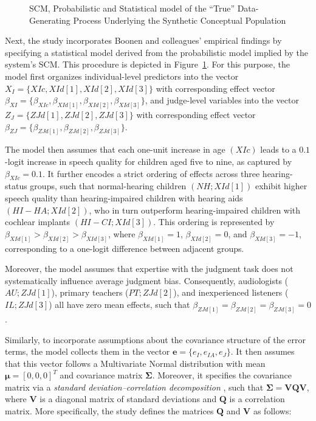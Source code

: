 \documentclass[
  authoryear,
  review,
  1p]{elsarticle}
\begin{document}
\begin{figure}[H]
\begin{minipage}[t]{0.33\linewidth}
{}


\end{minipage}%

\caption{\label{fig-CP}SCM, Probabilistic and Statistical model of the
``True'' Data-Generating Process Underlying the Synthetic Conceptual
Population}

\end{figure}%

Next, the study incorporates Boonen and colleagues'
\citeyearpar{Boonen_et_al_2020} empirical findings by specifying a
statistical model derived from the probabilistic model implied by the
system's SCM. This procedure is depicted in Figure~\ref{fig-CP}. For
this purpose, the model first organizes individual-level predictors into
the vector \(X_{I} = \{ XIc, XId[1], XId[2], XId[3] \}\) with
corresponding effect vector
\(\beta_{XI} = \{ \beta_{XIc}, \beta_{XId[1]}, \beta_{XId[2]}, \beta_{XId[3]} \}\),
and judge-level variables into the vector
\(Z_{J} = \{ ZJd[1], ZJd[2], ZJd[3] \}\) with corresponding effect
vector
\(\beta_{ZJ} = \{ \beta_{ZJd[1]}, \beta_{ZJd[2]}, \beta_{ZJd[3]} \}\).

The model then assumes that each one-unit increase in age \((XIc)\)
leads to a \(0.1\)-logit increase in speech quality for children aged
five to nine, as captured by \(\beta_{XIc} = 0.1\). It further encodes a
strict ordering of effects across three hearing-status groups, such that
normal-hearing children \((NH; XId[1])\) exhibit higher speech quality
than hearing-impaired children with hearing aids \((HI-HA; XId[2])\),
who in turn outperform hearing-impaired children with cochlear implants
\((HI-CI; XId[3])\). This ordering is represented by
\(\beta_{XId[1]} > \beta_{XId[2]} > \beta_{XId[3]}\), where
\(\beta_{XId[1]} = 1\), \(\beta_{XId[2]} = 0\), and
\(\beta_{XId[3]} = -1\), corresponding to a one-logit difference between
adjacent groups.

Moreover, the model assumes that expertise with the judgment task does
not systematically influence average judgment bias. Consequently,
audiologists (\(AU; ZJd[1]\)), primary teachers (\(PT; ZJd[2]\)), and
inexperienced listeners (\(IL; ZJd[3]\)) all have zero mean effects,
such that \(\beta_{ZJd[1]} = \beta_{ZJd[2]} = \beta_{ZJd[3]} = 0\).

Similarly, to incorporate assumptions about the covariance structure of
the error terms, the model collects them in the vector
\(\boldsymbol{e} = \{ e_{I}, e_{IA}, e_{J} \}\). It then assumes that
this vector follows a Multivariate Normal distribution with mean
\(\boldsymbol{\mu} = [0, 0, 0]^{T}\) and covariance matrix
\(\boldsymbol{\Sigma}\). Moreover, it specifies the covariance matrix
via a \emph{standard deviation--correlation decomposition}
\citep{McElreath_2020}, such that
\(\boldsymbol{\Sigma} = \boldsymbol{V}\boldsymbol{Q}\boldsymbol{V}\),
where \(\boldsymbol{V}\) is a diagonal matrix of standard deviations and
\(\boldsymbol{Q}\) is a correlation matrix. More specifically, the study
defines the matrices \(\boldsymbol{Q}\) and \(\boldsymbol{V}\) as
follows:
\end{document}
